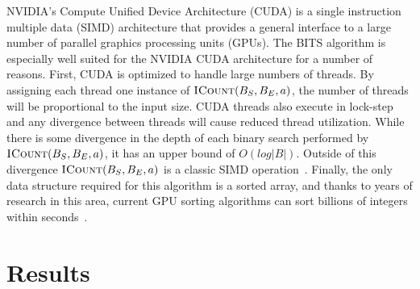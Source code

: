 \documentclass{bioinfo}
\begin{document}
NVIDIA's Compute Unified Device Architecture (CUDA) is a single instruction
multiple data (SIMD) architecture that provides a general interface to a large 
number of parallel graphics processing units 
(GPUs).  The BITS algorithm is especially well suited for the NVIDIA CUDA 
architecture for a number of reasons.  First, CUDA is optimized to handle large 
numbers of threads. By assigning each thread one instance of 
$\textsc{ICount}(B_S,B_E,a)$, the number of threads will be proportional to the 
input size.  CUDA threads also execute in lock-step and any divergence between 
threads will cause reduced thread utilization.  While there is some divergence
in the depth of each binary search performed by $\textsc{ICount}(B_S,B_E,a)$, it
has an upper bound of $O(log |B|)$.  Outside of this divergence
$\textsc{ICount}(B_S,B_E,a)$ is a classic SIMD operation~\citep{kirk2010}.
Finally, the only data structure required for this algorithm is a sorted array, 
and thanks to years of research in this area, current GPU sorting algorithms can 
sort billions of integers within seconds~\citep{merrill2011,satish2009}.

\section{Results}

\end{document}
